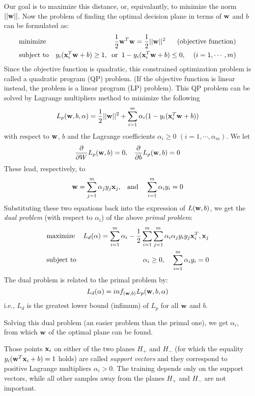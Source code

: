 Our goal is to maximize this distance, or, equivalantly, to minimize the 
norm $||{\bf w}||$. Now the problem of finding the optimal decision plane 
in terms of ${\bf w}$ and $b$ can be formulated as:
\begin{eqnarray}
  &	\mbox{minimize} & \frac{1}{2}{\bf w}^T {\bf w}=\frac{1}{2}||{\bf w}||^2 
  \;\;\;\;\;\;\mbox{(objective function)}	\nonumber \\
  &	\mbox{subject to} & y_i ({\bf x}_i^T {\bf w}+b) \ge 1,\;\;\mbox{or}\;\;
  1-y_i ({\bf x}_i^T {\bf w}+b) \le 0,\;\;\;\;(i=1,\cdots,m)
  \nonumber
\end{eqnarray}
Since the objective function is quadratic, this constrained optimization
problem is called a quadratic program (QP) problem. (If the objective function
is linear instead, the problem is a linear program (LP) problem). This QP 
problem can be solved by Lagrange multipliers method to minimize the following 
\[
L_p({\bf w},b,{\bf \alpha})=\frac{1}{2}||{\bf w}||^2
+\sum_{i=1}^m \alpha_i(1-y_i({\bf x}_i^T{\bf w}+b))
\]
with respect to ${\bf w}$, $b$ and the Lagrange coefficients $\alpha_i\ge 0$  
$(i=1,\cdots,\alpha_m)$.  We let
\[ 	\frac{\partial}{\partial W}L_p({\bf w},b)=0,\;\;\;
	\frac{\partial}{\partial b}L_p({\bf w},b)=0	\]
These lead, respectively, to
\[	{\bf w}=\sum_{j=1}^m \alpha_j y_j {\bf x}_j,\;\;\;\mbox{and}\;\;\;\;
	\sum_{i=1}^m \alpha_i y_i=0	\]
Substituting these two equations back into the expression of $L({\bf w},b)$,
we get the {\em dual problem} (with respect to $\alpha_i$) of the above 
{\em primal problem}:
\begin{eqnarray}
& 	\mbox{maximize} & L_d({\bf \alpha})=
	\sum_{i=1}^m\alpha_i -\frac{1}{2}
	\sum_{i=1}^m \sum_{j=1}^m \alpha_i \alpha_j y_i y_j {\bf x}_i^T,{\bf x}_j
	\nonumber \\
&	\mbox{subject to} & \alpha_i\ge 0,\;\;\;\;
	\sum_{i=1}^m \alpha_i y_i=0	\nonumber
\end{eqnarray}
The dual problem is related to the primal problem by:
\[	L_d({\bf \alpha})=inf_{({\bf w},b)} L_p({\bf w},b,{\bf \alpha})	\]
i.e., $L_d$ is the greatest lower bound (infimum) of $L_p$ for all ${\bf w}$ and $b$.

Solving this dual problem (an easier problem than the primal one), we get
$\alpha_i$, from which ${\bf w}$ of the optimal plane can be found. 

Those points ${\bf x}_i$ on either of the two planes $H_+$ and $H_-$ (for which 
the equality $y_i({\bf w}^T {\bf x}_i+b)=1$ holds) are called {\em support vectors}
and they correspond to positive Lagrange multipliers $\alpha_i>0$. The 
training depends only on the support vectors, while all other samples away 
from the planes $H_+$ and $H_-$ are not important.

